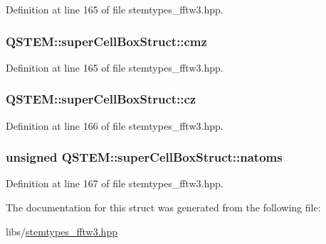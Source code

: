 Definition at line 165 of file stemtypes\-\_\-fftw3.\-hpp.

\hypertarget{struct_q_s_t_e_m_1_1super_cell_box_struct_a71acd27a7682ad5d7c8325bb158435a6}{
\subsubsection[{cmz}]{ Q\-S\-T\-E\-M\-::super\-Cell\-Box\-Struct\-::cmz}}\label{struct_q_s_t_e_m_1_1super_cell_box_struct_a71acd27a7682ad5d7c8325bb158435a6}


Definition at line 165 of file stemtypes\-\_\-fftw3.\-hpp.

\hypertarget{struct_q_s_t_e_m_1_1super_cell_box_struct_a53ae09de9dd9d799a53d149ac7512f34}{
\subsubsection[{cz}]{ Q\-S\-T\-E\-M\-::super\-Cell\-Box\-Struct\-::cz}}\label{struct_q_s_t_e_m_1_1super_cell_box_struct_a53ae09de9dd9d799a53d149ac7512f34}


Definition at line 166 of file stemtypes\-\_\-fftw3.\-hpp.

\hypertarget{struct_q_s_t_e_m_1_1super_cell_box_struct_a8137230f06157c71e74da82dcb7c121d}{
\subsubsection[{natoms}]{\setlength{\rightskip}{0pt plus 5cm}unsigned Q\-S\-T\-E\-M\-::super\-Cell\-Box\-Struct\-::natoms}}\label{struct_q_s_t_e_m_1_1super_cell_box_struct_a8137230f06157c71e74da82dcb7c121d}


Definition at line 167 of file stemtypes\-\_\-fftw3.\-hpp.



The documentation for this struct was generated from the following file\-:\begin{DoxyCompactItemize}
\item 
libs/\hyperlink{stemtypes__fftw3_8hpp}{stemtypes\-\_\-fftw3.\-hpp}\end{DoxyCompactItemize}
